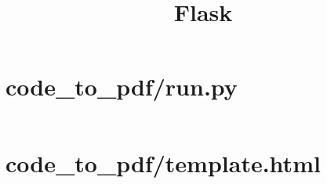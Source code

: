 \documentclass{article}
\title{Flask}
\begin{document}
\maketitle
{}


\newpage
\section{code\_to\_pdf/run.py}\label{sec:code-to-pdf:run.py}
\inputminted[bgcolor=black!5!white]{python}{/home/isidro/mp/code_to_pdf/src/code_to_pdf/run.py}
\newpage
\section{code\_to\_pdf/template.html}\label{sec:code-to-pdf:template.html}
\inputminted[bgcolor=black!5!white]{html}{/home/isidro/mp/code_to_pdf/src/code_to_pdf/template.html}
\end{document}

